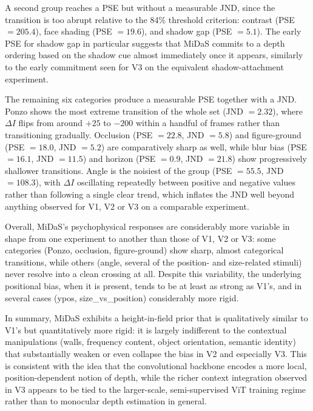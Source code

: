 \documentclass[10pt,twocolumn]{article}
\begin{document}
A second group reaches a PSE but without a measurable JND, since the transition is too
abrupt relative to the 84\% threshold criterion: contrast (PSE $=205.4$), face shading
(PSE $=19.6$), and shadow gap (PSE $=5.1$). The early PSE for shadow gap in particular
suggests that MiDaS commits to a depth ordering based on the shadow cue almost
immediately once it appears, similarly to the early commitment seen for V3 on the
equivalent shadow-attachment experiment.

The remaining six categories produce a measurable PSE together with a JND. Ponzo shows
the most extreme transition of the whole set (JND $= 2.32$), where $\Delta I$ flips from
around $+25$ to $-200$ within a handful of frames rather than transitioning gradually.
Occlusion (PSE $=22.8$, JND $=5.8$) and figure-ground (PSE $=18.0$, JND $=5.2$) are
comparatively sharp as well, while blur bias (PSE $=16.1$, JND $=11.5$) and horizon
(PSE $=0.9$, JND $=21.8$) show progressively shallower transitions. Angle is the
noisiest of the group (PSE $=55.5$, JND $=108.3$), with $\Delta I$ oscillating
repeatedly between positive and negative values rather than following a single clear
trend, which inflates the JND well beyond anything observed for V1, V2 or V3 on a
comparable experiment.

Overall, MiDaS's psychophysical responses are considerably more variable in shape from
one experiment to another than those of V1, V2 or V3: some categories (Ponzo, occlusion,
figure-ground) show sharp, almost categorical transitions, while others (angle, several
of the position- and size-related stimuli) never resolve into a clean crossing at all.
Despite this variability, the underlying positional bias, when it is present, tends to be
at least as strong as V1's, and in several cases (ypos, size\_vs\_position) considerably
more rigid.

In summary, MiDaS exhibits a height-in-field prior that is qualitatively similar
to V1's but quantitatively more rigid: it is largely indifferent to the contextual
manipulations (walls, frequency content, object orientation, semantic identity)
that substantially weaken or even collapse the bias in V2 and especially V3. This
is consistent with the idea that the convolutional backbone encodes a more local,
position-dependent notion of depth, while the richer context integration observed
in V3 appears to be tied to the larger-scale, semi-supervised ViT training regime
rather than to monocular depth estimation in general.

\end{document}
